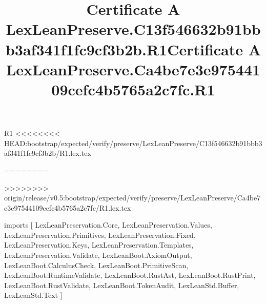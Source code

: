 \begin{lexlean}{R1}
<<<<<<<< HEAD:bootstrap/expected/verify/preserve/LexLeanPreserve/C13f546632b91bbb3af341f1fc9cf3b2b/R1.lex.tex
\title{Certificate A LexLeanPreserve.C13f546632b91bbb3af341f1fc9cf3b2b.R1}
========
\title{Certificate A LexLeanPreserve.Ca4be7e3e97544109cefc4b5765a2c7fc.R1}
>>>>>>>> origin/release/v0.5:bootstrap/expected/verify/preserve/LexLeanPreserve/Ca4be7e3e97544109cefc4b5765a2c7fc/R1.lex.tex
\begin{coremodule}
imports [
  LexLeanPreservation.Core,
  LexLeanPreservation.Values,
  LexLeanPreservation.Primitives,
  LexLeanPreservation.Fixed,
  LexLeanPreservation.Keys,
  LexLeanPreservation.Templates,
  LexLeanPreservation.Validate,
  LexLeanBoot.AxiomOutput,
  LexLeanBoot.CalculusCheck,
  LexLeanBoot.PrimitiveScan,
  LexLeanBoot.RuntimeValidate,
  LexLeanBoot.RustAst,
  LexLeanBoot.RustPrint,
  LexLeanBoot.RustValidate,
  LexLeanBoot.TokenAudit,
  LexLeanStd.Buffer,
  LexLeanStd.Text
]


\end{coremodule}
\end{lexlean}
